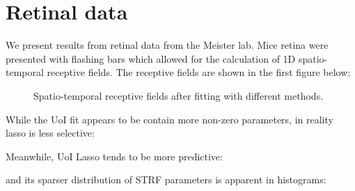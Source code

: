 \documentclass[11pt]{article}
\begin{document}
\section{Retinal data}
We present results from retinal data from the Meister lab. Mice retina were presented with flashing bars which allowed for the calculation of 1D spatio-temporal receptive fields. The receptive fields are shown in the first figure below:

\begin{figure}[H]
	\centering
	\caption{Spatio-temporal receptive fields after fitting with different methods.}
\end{figure}

While the UoI fit appears to be contain more non-zero parameters, in reality lasso is less selective:

\begin{figure}[H]
	\centering
\end{figure}

Meanwhile, UoI Lasso tends to be more predictive:

\begin{figure}[H]
	\centering
\end{figure}

and its sparser distribution of STRF parameters is apparent in histograms:

\begin{figure}[H]
	\centering
\end{figure}
\end{document}

